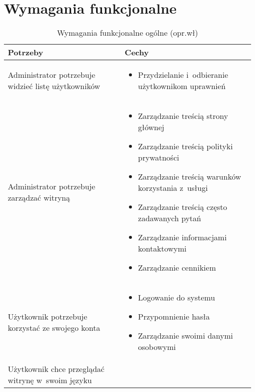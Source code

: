 \section{Wymagania funkcjonalne}\label{sec:functional-requirements}
\noindent
\begin{minipage}{\textwidth}
    \begin{table}[H]
        \centering\caption{Wymagania funkcjonalne ogólne (opr.wł)\label{tabela:wymaganiaFunkcjonalneOgolne}}
        \begin{tabular}{|P{.3\textwidth}|P{.6\textwidth}|}
            \hline
            Potrzeby & Cechy \\

            \hline
            Administrator potrzebuje widzieć listę użytkowników &
            \begin{itemize}
                \item Przydzielanie i~odbieranie użytkownikom uprawnień
            \end{itemize} \\
            \hline
            Administrator potrzebuje zarządzać witryną &
            \begin{itemize}
                \item Zarządzanie treścią strony głównej
                \item Zarządzanie treścią polityki prywatności
                \item Zarządzanie treścią warunków korzystania z~usługi
                \item Zarządzanie treścią często zadawanych pytań
                \item Zarządzanie informacjami kontaktowymi
                \item Zarządzanie cennikiem
            \end{itemize} \\
            \hline
            Użytkownik potrzebuje korzystać ze swojego konta &
            \begin{itemize}
                \item Logowanie do systemu
                \item Przypomnienie hasła
                \item Zarządzanie swoimi danymi osobowymi
            \end{itemize} \\
            \hline
            Użytkownik chce przeglądać witrynę w~swoim języku &
            \begin{itemize}

\end{itemize}
\end{tabular}
\end{table}
\end{minipage}
